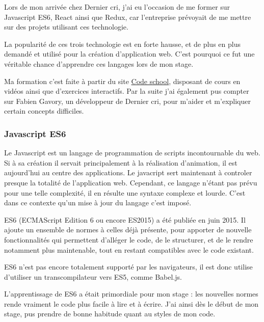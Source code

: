 \bigskip

Lors de mon arrivée chez Dernier cri, j'ai eu l'occasion de me former
sur Javascript ES6, React ainsi que Redux, car l'entreprise prévoyait de
me mettre sur des projets utilisant ces technologie.

\bigskip

La popularité de ces trois technologie est en forte hausse, et de plus
en plus demandé et utilisé pour la création d'application web. C'est
pourquoi ce fut une véritable chance d'apprendre ces langages lors de
mon stage.

\bigskip

Ma formation c'est faite à partir du site
\href{https://www.codeschool.com/}{Code school}, disposant de cours en
vidéos ainsi que d'exercices interactifs. Par la suite j'ai également
pus compter sur Fabien Gavory, un développeur de Dernier cri, pour
m'aider et m'expliquer certain concepts difficiles.

\bigskip

\subsubsection{Javascript ES6}\label{javascript-es6}

\bigskip

Le Javascript est un langage de programmation de scripts incontournable
du web. Si à sa création il servait principalement à la réalisation
d'animation, il est aujourd'hui au centre des applications. Le javacript
sert maintenant à controler presque la totalité de l'application web.
Cependant, ce langage n'étant pas prévu pour une telle complexité, il en
résulte une syntaxe complexe et lourde. C'est dans ce contexte qu'un
mise à jour du langage c'est imposé.

\bigskip

ES6 (ECMAScript Edition 6 ou encore ES2015) a été publiée en juin 2015.
Il ajoute un ensemble de normes à celles déjà présente, pour apporter de
nouvelle fonctionnalités qui permettent d'alléger le code, de le
structurer, et de le rendre notamment plus maintenable, tout en restant
compatibles avec le code existant.

\bigskip

ES6 n'est pas encore totalement supporté par les navigateurs, il est
donc utilise d'utiliser un transcompilateur vers ES5, comme Babel.js.

\bigskip

L'apprentissage de ES6 a était primordiale pour mon stage : les
nouvelles normes rende vraiment le code plus facile à lire et à écrire.
J'ai ainsi dès le début de mon stage, pus prendre de bonne habitude
quant au styles de mon code.

